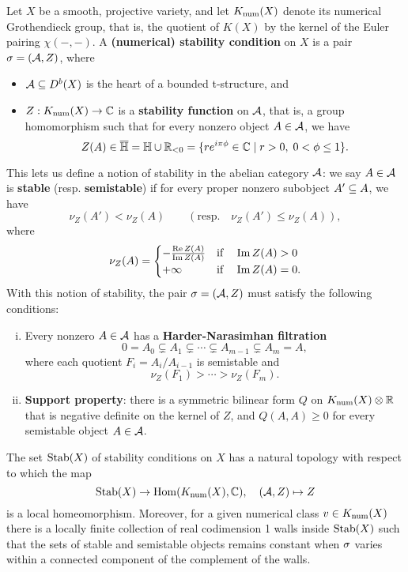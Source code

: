Let $X$ be a smooth, projective variety, and let $K_{\mathrm{num}}(X)$ denote its numerical Grothendieck group, that is, the quotient of $K(X)$ by the kernel of the Euler pairing $\chi(-,-)$. A \textbf{(numerical) stability condition} on $X$ is a pair $\sigma = (\mathcal{A}, Z)$, where \begin{itemize}
    \item $\mathcal{A} \subseteq D^b(X)$ is the heart of a bounded t-structure, and
    \item $Z: K_{\mathrm{num}}(X) \to \mathbb{C}$ is a {\bf stability function} on $\mathcal{A}$, that is, a group homomorphism such that for every nonzero object $A \in \mathcal{A}$, we have 
    \[ Z(A) \in \overline{\mathbb{H}} = \mathbb{H} \cup \mathbb{R}_{<0} = \{ r e^{i\pi\phi} \in \mathbb{C} \;|\; r > 0, \; 0 < \phi \le 1 \}. \]
\end{itemize} 
This lets us define a notion of stability in the abelian category $\mathcal{A}$: we say $A \in \mathcal{A}$ is \textbf{stable} (resp. \textbf{semistable}) if for every proper nonzero subobject $A' \subseteq A$, we have
\[ \nu_Z(A') < \nu_Z(A) \qquad (\mathrm{resp.} \quad \nu_Z(A') \leq \nu_Z(A)), \]
where 
\[ \nu_Z(A) = \begin{cases} -\frac{\operatorname{\mathrm{Re}} Z(A)}{\operatorname{\mathrm{Im}} Z(A)} & \mathrm{if} \quad \operatorname{\mathrm{Im}} Z(A) > 0 \\ +\infty & \mathrm{if} \quad \operatorname{\mathrm{Im}} Z(A) = 0. \end{cases} \]
With this notion of stability, the pair $\sigma = (\mathcal{A}, Z)$ must satisfy the following conditions:
\begin{enumerate}[(i)]
    \item Every nonzero $A \in \mathcal{A}$ has a {\bf Harder-Narasimhan filtration}
    \[ 0 = A_0 \subsetneq A_1 \subsetneq \cdots \subsetneq A_{m-1} \subsetneq A_m = A, \]
    where each quotient $F_i = A_i/A_{i-1}$ is semistable and
    \[ \nu_Z(F_1) > \cdots > \nu_Z(F_m).  \]
    \item {\bf Support property}: there is a symmetric bilinear form $Q$ on $K_{\mathrm{num}}(X) \otimes \mathbb{R}$ that is negative definite on the kernel of $Z$, and $Q(A, A) \ge 0$ for every semistable object $A \in \mathcal{A}$.
\end{enumerate}

The set $\operatorname{\mathrm{Stab}}(X)$ of stability conditions on $X$ has a natural topology with respect to which the map 
\[ \operatorname{\mathrm{Stab}}(X) \to \mathrm{Hom}(K_{\mathrm{num}}(X), \mathbb{C}), \quad (\mathcal{A}, Z) \mapsto Z \]
is a local homeomorphism. Moreover, for a given numerical class $v \in K_{\mathrm{num}}(X)$ there is a locally finite collection of real codimension 1 walls inside $\operatorname{\mathrm{Stab}}(X)$ such that the sets of stable and semistable objects remains constant when $\sigma$ varies within a connected component of the complement of the walls. 

